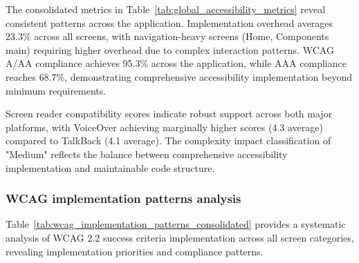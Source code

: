 \FloatBarrier

The consolidated metrics in Table~\ref{tab:global_accessibility_metrics} reveal consistent patterns across the application. Implementation overhead averages 23.3\% across all screens, with navigation-heavy screens (Home, Components main) requiring higher overhead due to complex interaction patterns. WCAG A/AA compliance achieves 95.3\% across the application, while AAA compliance reaches 68.7\%, demonstrating comprehensive accessibility implementation beyond minimum requirements.

Screen reader compatibility scores indicate robust support across both major platforms, with VoiceOver achieving marginally higher scores (4.3 average) compared to TalkBack (4.1 average). The complexity impact classification of "Medium" reflects the balance between comprehensive accessibility implementation and maintainable code structure.

\subsubsection{WCAG implementation patterns analysis}
\label{subsubsec:wcag-patterns-analysis}

Table~\ref{tab:wcag_implementation_patterns_consolidated} provides a systematic analysis of WCAG 2.2 success criteria implementation across all screen categories, revealing implementation priorities and compliance patterns.

